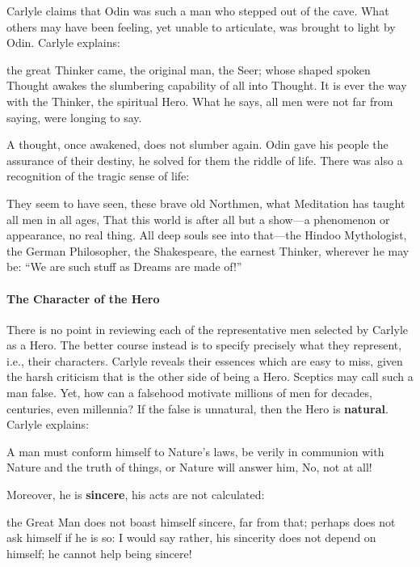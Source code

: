 Carlyle claims that Odin was such a man who stepped out of the cave. What others may have been feeling, yet unable to articulate, was brought to light by Odin. Carlyle explains:

\begin{quotex}
the great Thinker came, the original man, the Seer; whose shaped spoken Thought awakes the slumbering capability of all into Thought. It is ever the way with the Thinker, the spiritual Hero. What he says, all men were not far from saying, were longing to say.
\end{quotex}


A thought, once awakened, does not slumber again. Odin gave his people the assurance of their destiny, he solved for them the riddle of life. There was also a recognition of the tragic sense of life:

\begin{quotex}
They seem to have seen, these brave old Northmen, what Meditation has taught all men in all ages, That this world is after all but a show---a phenomenon or appearance, no real thing. All deep souls see into that---the Hindoo Mythologist, the German Philosopher, the Shakespeare, the earnest Thinker, wherever he may be: ``We are such stuff as Dreams are made of!''
\end{quotex}


\paragraph{The Character of the Hero}


There is no point in reviewing each of the representative men selected by Carlyle as a Hero. The better course instead is to specify precisely what they represent, i.e., their characters. Carlyle reveals their essences which are easy to miss, given the harsh criticism that is the other side of being a Hero. Sceptics may call such a man false. Yet, how can a falsehood motivate millions of men for decades, centuries, even millennia? If the false is unnatural, then the Hero is \textbf{natural}. Carlyle explains:

\begin{quotex}
A man must conform himself to Nature's laws, be verily in communion with Nature and the truth of things, or Nature will answer him, No, not at all!
\end{quotex}


Moreover, he is \textbf{sincere}, his acts are not calculated:

\begin{quotex}
the Great Man does not boast himself sincere, far from that; perhaps does not ask himself if he is so: I would say rather, his sincerity does not depend on himself; he cannot help being sincere!
\end{quotex}


